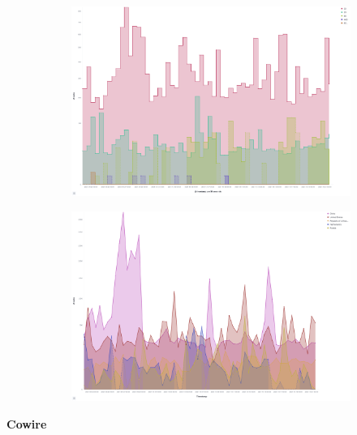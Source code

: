 \begin{figure}
    \centering

    \begin{subfigure}[b]{0.49\textwidth}
        \centering
        \includegraphics[width=\textwidth]{figures/tpot-cowire-attacks.png}
        \caption{}
        \label{fig:tpot-rdpy-attacks}
    \end{subfigure}
    \hfill
    \begin{subfigure}[b]{0.49\textwidth}
        \centering
        \includegraphics[width=\textwidth]{figures/tpot-cowire-country.png}
        \caption{}
        \label{fig:tpot-rdpy-country}
    \end{subfigure}
    \caption[]{}
    \label{fig:rdpy-results}
\end{figure}


\textbf{Cowire}

